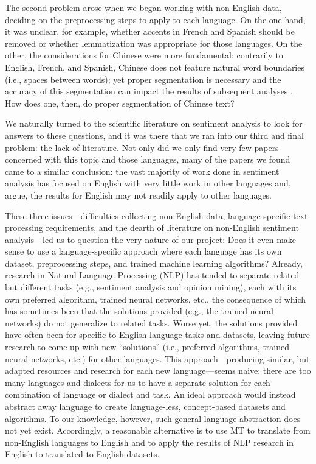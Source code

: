 \documentclass[11pt,a4paper]{article}
\begin{document}
The second problem arose when we began working with non-English data, deciding on the preprocessing steps to apply to each language. On the one hand, it was unclear, for example, whether accents in French and Spanish should be removed or whether lemmatization was appropriate for those languages. On the other, the considerations for Chinese were more fundamental: contrarily to English, French, and Spanish, Chinese does not feature natural word boundaries (i.e., spaces between words); yet proper segmentation is necessary and the accuracy of this segmentation can impact the results of subsequent analyses \cite{chen2018fine}. How does one, then, do proper segmentation of Chinese text?

We naturally turned to the scientific literature on sentiment analysis to look for answers to these questions, and it was there that we ran into our third and final problem: the lack of literature. Not only did we only find very few papers concerned with this topic and those languages, many of the papers we found came to a similar conclusion: the vast majority of work done in sentiment analysis has focused on English with very little work in other languages \cite{aydougan2016comprehensive, balahur2012multilingual, ghorbel2011sentiment, korayem2016sentiment, pang2008opinion} and, \citet{chen2018fine} argue, the results for English may not readily apply to other languages.

These three issues---difficulties collecting non-English data, language-specific text processing requirements, and the dearth of literature on non-English sentiment analysis---led us to question the very nature of our project: Does it even make sense to use a language-specific approach where each language has its own dataset, preprocessing steps, and trained machine learning algorithms? Already, research in Natural Language Processing (NLP) has tended to separate related but different tasks (e.g., sentiment analysis and opinion mining), each with its own preferred algorithm, trained neural networks, etc., the consequence of which has sometimes been that the solutions provided (e.g., the trained neural networks) do not generalize to related tasks. Worse yet, the solutions provided have often been for specific to English-language tasks and datasets, leaving future research to come up with new ``solutions'' (i.e., preferred algorithms, trained neural networks, etc.) for other languages. This approach---producing similar, but adapted resources and research for each new language---seems naive: there are too many languages and dialects for us to have a separate solution for each combination of language or dialect and task. An ideal approach would instead abstract away language to create language-less, concept-based datasets and algorithms. To our knowledge, however, such general language abstraction does not yet exist. Accordingly, a reasonable alternative is to use MT to translate from non-English languages to English and to apply the results of NLP research in English to translated-to-English datasets.
\end{document}
